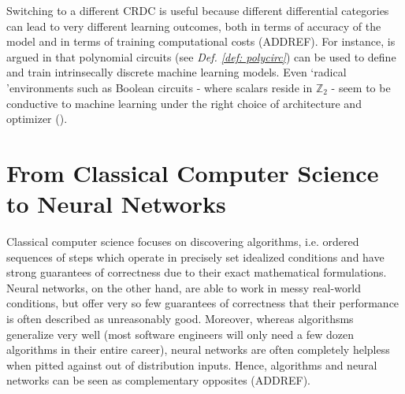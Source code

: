 \documentclass[12pt,a4paper,openright,twoside]{report}
\theoremstyle{plain}
\theoremstyle{definition}
\begin{document}
Switching to a different CRDC is useful because different differential categories can lead to very different learning outcomes, both in terms of accuracy of the model and in terms of training computational costs (ADDREF).
For instance, is argued in \cite{wilson2022categories} that polynomial circuits (see \textit{Def. \ref{def: polycirc}}) can be used to define and train intrinsecally discrete machine learning models. Even \lq radical \rq environments such as Boolean circuits - where scalars reside in $\mathbb{Z}_2$ - seem to be conductive to machine learning under the right choice of architecture and optimizer (\cite{wilson2021reverse}).
































































\chapter{From Classical Computer Science to Neural Networks}


\lhead[\fancyplain{}{\bfseries\thepage}]{\fancyplain{}{\bfseries\rightmark}}




Classical computer science focuses on discovering algorithms, i.e. ordered sequences of steps which operate in precisely set idealized conditions and have strong guarantees of correctness due to their exact mathematical formulations. Neural networks, on the other hand, are able to work in messy real-world conditions, but offer very so few guarantees of correctness that their performance is often described as unreasonably good. Moreover, whereas algorithsms generalize very well (most software engineers will only need a few dozen algorithms in their entire career), neural networks are often completely helpless when pitted against out of distribution inputs. Hence, algorithms and neural networks can be seen as complementary opposites (ADDREF).
\end{document}
